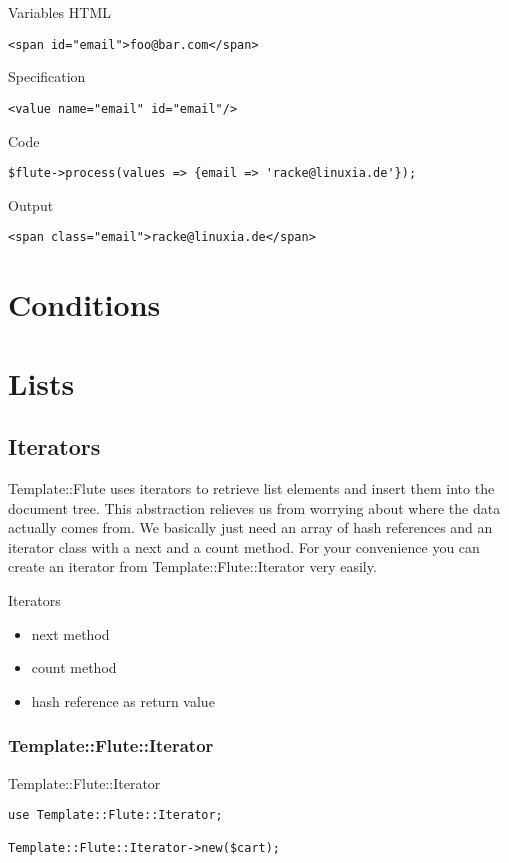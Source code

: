 \begin{frame}[fragile]{Variables}
HTML
\begin{lstlisting}
<span id="email">foo@bar.com</span>
\end{lstlisting}
Specification
\begin{lstlisting}
<value name="email" id="email"/>
\end{lstlisting}
Code
\begin{lstlisting}
$flute->process(values => {email => 'racke@linuxia.de'});
\end{lstlisting}
Output
\begin{lstlisting}
<span class="email">racke@linuxia.de</span>
\end{lstlisting}
\end{frame}

\section{Conditions}

\section{Lists}

\subsection{Iterators}
Template::Flute uses iterators to retrieve list elements and insert them into
the document tree. This abstraction relieves us from worrying about where
the data actually comes from. We basically just need an array of hash
references and an iterator class with a next and a count method. For your
convenience you can create an iterator from Template::Flute::Iterator
very easily.

\begin{frame}{Iterators}
\begin{itemize}
  \item next method
  \item count method
  \item hash reference as return value
 \end{itemize}
\end{frame}

\subsubsection{Template::Flute::Iterator}
\begin{frame}[fragile]{Template::Flute::Iterator}
\begin{lstlisting}
use Template::Flute::Iterator;

Template::Flute::Iterator->new($cart);
\end{lstlisting}
\end{frame}

